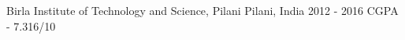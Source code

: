 

\begin{cventries}

  \cventry
    {Birla Institute of Technology and Science, Pilani} %
    {Pilani, India} %
    {2012 - 2016} %
    {CGPA - 7.316/10}
    {
      \begin{cvitems} %
      \end{cvitems}
    }

\end{cventries}
